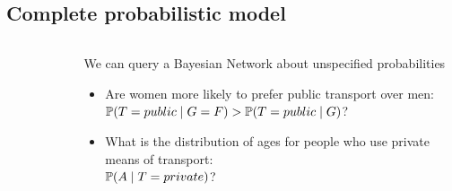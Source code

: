 \subsection{Complete probabilistic model}
	\begin{frame}
		\begin{columns}
			\begin{column}{.3\textwidth}
				\begin{figure}
					\centering
					
				\end{figure}
			\end{column}
			\begin{column}{.7\textwidth}
				We can query a Bayesian Network about unspecified probabilities
				\begin{itemize}
					\item Are women more likely to prefer public transport over men:\\
						$\P( T = public \mid G = F ) > \P( T = public \mid G )$?
					\item What is the distribution of ages for people who use private means of transport:\\
						$\P( A \mid T = private )$?
				\end{itemize}
			\end{column}
		\end{columns}
	\end{frame}